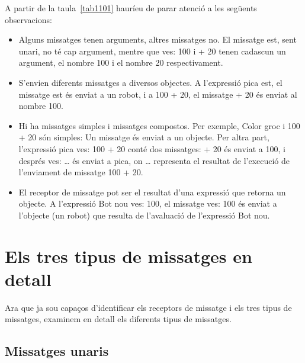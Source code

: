 A partir de la taula~\ref{tab1101} hauríeu de parar atenció a les següents observacions:
\begin{itemize}
\item Alguns missatges tenen arguments, altres missatges no. El missatge \textsf{est}, sent unari, no té cap argument, mentre que \textsf{ves: 100} i \textsf{+ 20} tenen cadascun un argument, el nombre \textsf{100} i el nombre \textsf{20} respectivament.
\item S'envien diferents missatges a diversos objectes. A l'expressió \textsf{pica est}, el missatge \textsf{est} és enviat a un robot, i a \textsf{100 + 20}, el missatge \textsf{+ 20} és enviat al nombre \textsf{100}.
\item Hi ha missatges simples i missatges compostos. Per exemple, \textsf{Color groc} i \textsf{100 + 20} són simples: Un missatge és enviat a un objecte. Per altra part, l'expressió \textsf{pica ves: 100 + 20} conté dos missatges: \textsf{+ 20} és enviat a \textsf{100}, i després \textsf{ves: \dots} és enviat a \textsf{pica}, on \textsf{\dots} representa el resultat de l'execució de l'enviament de missatge \textsf{100 + 20}. 
\item El receptor de missatge pot ser el resultat d'una expressió que retorna un objecte. A l'expressió \textsf{Bot nou ves: 100}, el missatge \textsf{ves: 100} és enviat a l'objecte (un robot) que resulta de l'avaluació de l'expressió \textsf{Bot nou}.
\end{itemize}

\section{Els tres tipus de missatges en detall}
Ara que ja sou capaços d'identificar els receptors de missatge i els tres tipus de missatges, examinem en detall els diferents tipus de missatges.

\subsection{Missatges unaris}

